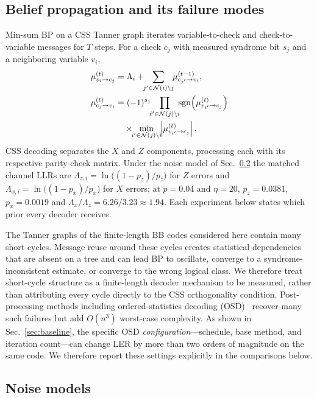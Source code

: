 \documentclass[a4paper,twocolumn,11pt,nopdfoutputerror]{quantumarticle}
\newcommand{\llr}{\Lambda}
\begin{document}
\subsection{Belief propagation and its failure modes}\label{sec:bp}

Min-sum BP on a CSS Tanner graph iterates variable-to-check and
check-to-variable messages for $T$ steps. For a check $c_j$ with measured
syndrome bit $s_j$ and a neighboring variable $v_i$,
\begin{align}
\mu_{v_i \to c_j}^{(t)}
&= \llr_i + \!\!\sum_{j' \in \mathcal{N}(i)\setminus j}\!\!
\mu_{c_{j'} \to v_i}^{(t-1)},
\label{eq:vtc}\\
\mu_{c_j \to v_i}^{(t)}
&= (-1)^{s_j}
\!\!\prod_{i' \in \mathcal{N}(j)\setminus i}\!\!
\mathrm{sgn}\!\left(\mu_{v_{i'}\to c_j}^{(t)}\right) \notag\\
&\quad \times
\!\!\min_{i'\in\mathcal{N}(j)\setminus i}\!\!
\left|\mu_{v_{i'}\to c_j}^{(t)}\right|.
\label{eq:ctv}
\end{align}
CSS decoding separates the $X$ and $Z$ components, processing each with
its respective parity-check matrix. Under the noise model of
Sec.~\ref{sec:noise} the matched channel LLRs are
$\llr_{z,i} = \ln\bigl((1-p_z)/p_z\bigr)$ for $Z$ errors and
$\llr_{x,i} = \ln\bigl((1-p_x)/p_x\bigr)$ for $X$ errors; at $p=0.04$ and
$\eta=20$, $p_z=0.0381$, $p_x=0.0019$ and
$\llr_{x}/\llr_{z}=6.26/3.23\approx1.94$. Each experiment below states
which prior every decoder receives.

The Tanner graphs of the finite-length BB codes considered here contain
many short cycles. Message reuse around these cycles creates statistical
dependencies that are absent on a tree and can lead BP to oscillate,
converge to a syndrome-inconsistent estimate, or converge to the wrong
logical class. We therefore treat short-cycle structure as a finite-length
decoder mechanism to be measured, rather than attributing every cycle
directly to the CSS orthogonality condition. Post-processing methods
including ordered-statistics decoding (OSD)~\cite{Fossorier1995OSD}
recover many such failures but add $O(n^3)$ worst-case complexity.
As shown in Sec.~\ref{sec:baseline}, the specific OSD
\emph{configuration}---schedule, base method, and iteration count---can
change LER by more than two orders of magnitude on the same code. We
therefore report these settings explicitly in the comparisons below.

\subsection{Noise models}\label{sec:noise}
\end{document}
